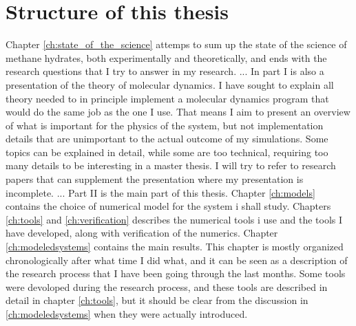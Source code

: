 \section{Structure of this thesis}

Chapter \ref{ch:state_of_the_science} attemps to sum up the state of the science of methane hydrates, both experimentally and theoretically, and ends with the research questions that I try to answer in my research.
...
In part I is also a presentation of the theory of molecular dynamics. I have sought to explain all theory needed to in principle implement a molecular dynamics program that would do the same job as the one I use. That means I aim to present an overview of what is important for the physics of the system, but not implementation details that are unimportant to the actual outcome of my simulations. Some topics can be explained in detail, while some are too technical, requiring too many details to be interesting in a master thesis. I will try to refer to research papers that can supplement the presentation where my presentation is incomplete.
...
Part II is the main part of this thesis. Chapter \ref{ch:models} contains the choice of numerical model for the system i shall study. Chapters \ref{ch:tools} and \ref{ch:verification} describes the numerical tools i use and the tools I have developed, along with verification of the numerics. Chapter \ref{ch:modeledsystems} contains the main results. This chapter is mostly organized chronologically after what time I did what, and it can be seen as a description of the research process that I have been going through the last months. Some tools were devoloped during the research process, and these tools are described in detail in chapter \ref{ch:tools}, but it should be clear from the discussion in \ref{ch:modeledsystems} when they were actually introduced.



